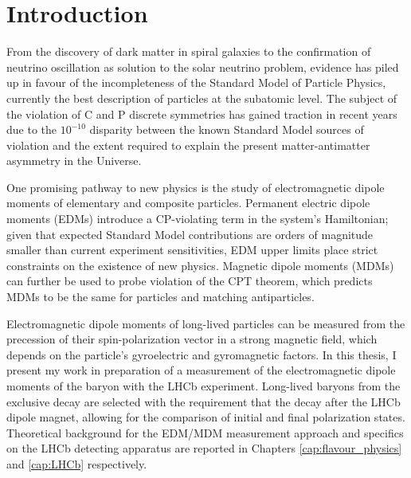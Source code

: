 \chapter*{Introduction}

%

From the discovery of dark matter in spiral galaxies to the confirmation of neutrino oscillation as solution to the solar neutrino problem, evidence has piled up in favour of the incompleteness of the Standard Model of Particle Physics, currently the best description of particles at the subatomic level.
The subject of the violation of C and P discrete symmetries has gained traction in recent years due to the ${10}^{-10}$ disparity between the known Standard Model sources of violation and the extent required to explain the present matter-antimatter asymmetry in the Universe. 

One promising pathway to new physics is the study of electromagnetic dipole moments of elementary and composite particles.
Permanent electric dipole moments (EDMs) introduce a CP-violating term in the system's Hamiltonian;
given that expected Standard Model contributions are orders of magnitude smaller than current experiment sensitivities, EDM upper limits place strict constraints on the existence of new physics.
Magnetic dipole moments (MDMs) can further be used to probe violation of the CPT theorem, which predicts MDMs to be the same for particles and matching antiparticles.

Electromagnetic dipole moments of long-lived particles can be measured from the precession of their spin-polarization vector in a strong magnetic field, which depends on the particle's gyroelectric and gyromagnetic factors.
In this thesis, I present my work in preparation of a measurement of the electromagnetic dipole moments of the \lz baryon with the LHCb experiment.
Long-lived \lz baryons from the exclusive \demonstratorfull decay are selected with the requirement that the \lz decay after the LHCb dipole magnet, allowing for the comparison of initial and final polarization states.
Theoretical background for the EDM/MDM measurement approach and specifics on the LHCb detecting apparatus are reported in Chapters \ref{cap:flavour_physics} and \ref{cap:LHCb} respectively.



